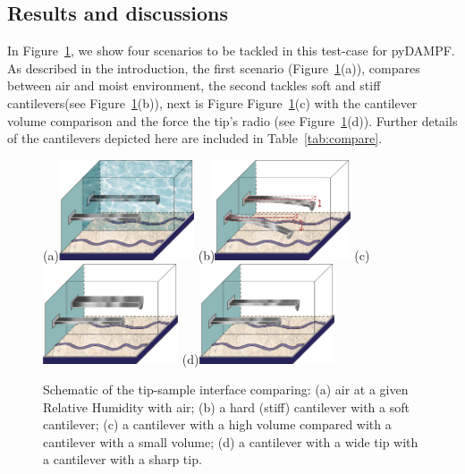 \documentclass[letterpaper,compsoc,twoside]{IEEEtran}
\begin{document}
\subsection{Results and discussions%
  \label{Results and discussions}%
}

In Figure~\ref{fig1}, we show four scenarios to be tackled in this test-case for pyDAMPF. As described in the introduction, the first scenario (Figure~\ref{fig1}(a)), compares between air and moist environment, the second tackles soft and stiff cantilevers(see Figure~\ref{fig1}(b)), next is Figure  Figure~\ref{fig1}(c) with the cantilever volume comparison and the force the tip's radio (see Figure~\ref{fig1}(d)). Further details of the cantilevers depicted here are included in Table~\ref{tab:compare}.

\begin{figure}[H]

\centering
\subfigure(a){\includegraphics[width=40mm]{casoa.png}}
\subfigure(b){\includegraphics[width=40mm]{casob.png}}
\subfigure(c){\includegraphics[width=40mm]{casoc.png}}
\subfigure(d){\includegraphics[width=40mm]{casod.png}}
\caption{Schematic of the tip-sample interface comparing: (a) air at a given Relative Humidity with air; (b) a hard (stiff) cantilever with a soft cantilever; (c) a cantilever with a high volume compared with a cantilever with a small volume; (d) a cantilever with a wide tip with a cantilever with a sharp tip.} 

\label{fig1}
\end{figure}
\end{document}

